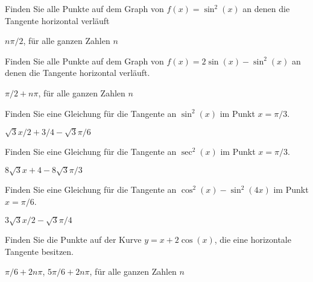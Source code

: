 \begin{exercises}
\begin{exercise} Finden Sie alle Punkte auf dem Graph von
$f(x)=\sin^2(x)$ an denen die Tangente horizontal verläuft
\begin{answer} $n\pi/2$, für alle ganzen Zahlen $n$
\end{answer}\end{exercise}

\begin{exercise} Finden Sie alle Punkte auf dem Graph von $f(x) = 2\sin(x) -
\sin^2(x)$ an denen die Tangente horizontal verläuft.
\begin{answer} $\pi/2+n\pi$, für alle ganzen Zahlen $n$
\end{answer}\end{exercise}

\begin{exercise} Finden Sie eine Gleichung für die Tangente an $\sin^2(x)$ im Punkt 
$x=\pi/3$.
\begin{answer} $\sqrt3x/2+3/4-\sqrt3\pi/6$
\end{answer}\end{exercise}

\begin{exercise} Finden Sie eine Gleichung für die Tangente an $\sec^2(x)$
im Punkt  $x=\pi/3$.
\begin{answer} $8\sqrt3x+4-8\sqrt3\pi/3$
\end{answer}\end{exercise}

\begin{exercise} Finden Sie eine Gleichung für die Tangente an $\cos^2(x) -
\sin^2(4x)$ im Punkt  $x=\pi/6$.
\begin{answer} $3\sqrt3x/2-\sqrt3\pi/4$
\end{answer}\end{exercise}

\begin{exercise} Finden Sie die Punkte auf der Kurve $y= x+ 2\cos(x)$, die eine horizontale Tangente besitzen.
\begin{answer} $\pi/6+2n\pi$, $5\pi/6+2n\pi$, für alle ganzen Zahlen $n$
\end{answer}\end{exercise}

\end{exercises}





